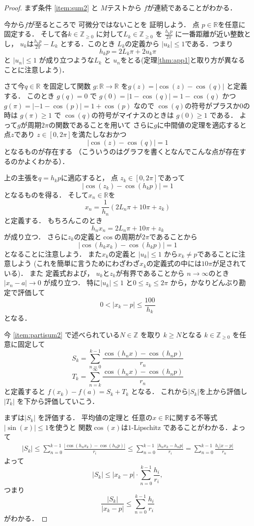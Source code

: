 \documentclass[leqno, a4paper, 12pt]{jsarticle}
\newcommand{\zz}{\mathbb{Z}}
\newcommand{\rr}{\mathbb{R}}
\begin{document}
\begin{proof}
まず条件
\ref{item:sum2}
と
$M$テストから
$f$が連続であることがわかる．

今から$f$が至るところで
可微分ではないことを
証明しよう．
点
$p\in \rr$を任意に固定する．
そして各$k\in \zz_{\ge 0}$
に対して$L_{k}\in \zz_{\ge 0}$
を
$\frac{h_{k}p}{2\pi}$
に一番距離が近い整数とし，
$u_{k}$は$\frac{h_{k}p}{2\pi}-L_{k}$
とする．このとき
$L_{k}$の定義から
$|u_{k}|\le 1$である．つまり
\[
h_{k}p=2L_{k}\pi +2u_{k}\pi
\]
と
$|u_{n}|\le 1$
が成り立つような$L_{k}$
と
$u_{n}$をとる(定理\ref{thm:app1}と取り方が異なることに注意しよう)．

さて今$q\in \rr$
を固定して関数
$g\colon \rr\to \rr$
を$g(z)=|\cos(z)-\cos(q)|$
と定義する．
このとき
$g(q)=0$
で
$g(0)=|1-\cos(q)|=1-\cos(q)$
かつ
$g(\pi)=|-1-\cos(p)|=1+\cos(p)$
なので
$\cos(q)$の符号がプラスか$0$の時は
$g(\pi)\ge 1$
で
$\cos(q)$の符号がマイナスのときは
$g(0)\ge 1$
である．
よって$g$が周期$2\pi$の関数であることを用いて
さらに$g$に中間値の定理を適応すると点$z$であり
$z\in [0, 2\pi]$を満たしなおかつ
\[
|\cos(z)-\cos(q)|=1
\]
となるものが存在する
（こういうのはグラフを書くとなんでこんな点が存在するのかよくわかる）．

上の主張を$q=h_{k}p$に適応すると，
点
$z_{k}\in [0, 2\pi]$であって
\[
|\cos(z_{k})-\cos(h_{k}p)|=1
\]
となるものを得る．
そして$x_{n}\in\rr$を
\[
x_{n}=\frac{1}{h_{n}}(2L_{n}\pi+10\pi +z_{k})
\]
と定義する．
もちろんこのとき
\[
h_{n}x_{n}=2L_{n}\pi +10\pi+z_{k}
\]
が成り立つ．
さらに$z_{k}$の定義と$\cos$の周期が$2\pi$であることから
\[
|\cos(h_{k}x_{k})-\cos(h_{k}p)|=1
\]
となることに注意しよう．
また$x_{k}$の定義と
$|u_{k}|\le 1$
から$x_{k}\neq p$であることに注意しよう
(これを簡単に言うためにわざわざ$x_{k}$の定義式の中には$10\pi$が足されている)．
また
定義式および，
$u_{k}$と$z_{k}$が有界であることから
$n\to \infty$のとき
$|x_{n}-a|\to 0$
が成り立つ．
特に$|u_{k}|\le 1$
と$0\le z_{k}\le 2\pi$
から，かなりどんぶり勘定で評価して
\[
0<|x_{k}-p|\le \frac{100}{h_{k}}
\]
となる．

今
\ref{item:partisum2}
で述べられている$N\in \zz$
を取り
$k\ge N$となる
$k\in \zz_{\ge 0}$
を任意に固定して
\[
S_{k}=\sum_{n=0}^{k-1}\frac{\cos(h_{n}x)-\cos(h_{n}p)}{r_{n}}
\]
\[
T_{k}=\sum_{n=k}^{\infty}
\frac{\cos(h_{n}x)-\cos(h_{n}p)}{r_{n}}
\]
と定義すると
$f(x_{k})-f(a)=S_{k}+T_{k}$
となる．
これから$|S_{k}|$を上から評価し
$|T_{k}|$
を下から評価していこう．

まずは$|S_{k}|$
を評価する．
平均値の定理と
任意の$x\in \rr$に関する不等式$|\sin(x)|\le 1$を使うと
関数$\cos(x)$は$1$-Lipschitz 
であることがわかる．よって
\begin{align*}
|S_{k}|\le 
\sum_{n=0}^{k-1}\frac{|\cos(h_{n}x_{k})-\cos(h_{n}p)|}{r_{i}} 
\le 
\sum_{n=0}^{k-1}\frac{|h_{n}x_{k}-h_{n}p|}{r_{i}} 
=
\sum_{n=0}^{k-1}\frac{h_{i}|x-p|}{r_{n}}
\end{align*}
よって
\[
\left|S_{k}\right|
\le |x_{k}-p|\cdot \sum_{n=0}^{k-1}\frac{h_{i}}{r_{i}}, 
\]
つまり
\[
\frac{\left|S_{k}\right|}{|x_{k}-p|}\le 
\sum_{n=0}^{k-1}\frac{h_{i}}{r_{i}}
\]
がわかる．



\end{proof}
\end{document}
